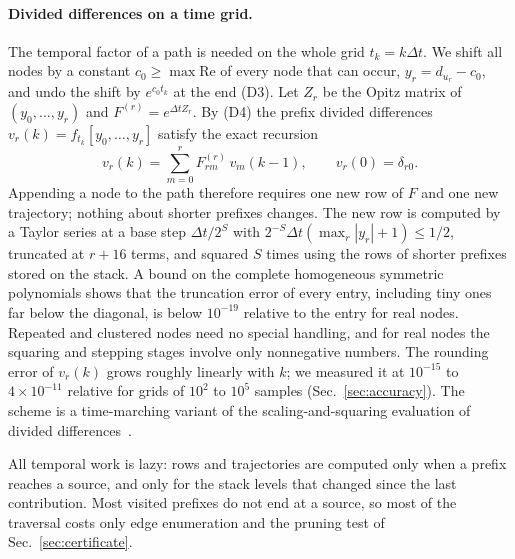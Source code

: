 \documentclass[aps,pra,superscriptaddress,floatfix,longbibliography,twocolumn]{revtex4-2}
\begin{document}
\paragraph*{Divided differences on a time grid.} The temporal factor of a path is needed on the whole grid $t_k=k\Delta t$. We shift all nodes by a constant $c_0\ge\max\mathrm{Re}$ of every node that can occur, $y_r=d_{u_r}-c_0$, and undo the shift by $e^{c_0t_k}$ at the end (D3). Let $Z_r$ be the Opitz matrix of $(y_0,\dots,y_r)$ and $F^{(r)}=e^{\Delta t Z_r}$. By (D4) the prefix divided differences $v_r(k)=f_{t_k}[y_0,\dots,y_r]$ satisfy the exact recursion
\begin{equation}\label{eq:traj}
v_r(k)=\sum_{m=0}^{r}F^{(r)}_{rm}\,v_m(k-1),\qquad v_r(0)=\delta_{r0}.
\end{equation}
Appending a node to the path therefore requires one new row of $F$ and one new trajectory; nothing about shorter prefixes changes. The new row is computed by a Taylor series at a base step $\Delta t/2^S$ with $2^{-S}\Delta t(\max_r|y_r|+1)\le1/2$, truncated at $r+16$ terms, and squared $S$ times using the rows of shorter prefixes stored on the stack. A bound on the complete homogeneous symmetric polynomials shows that the truncation error of every entry, including tiny ones far below the diagonal, is below $10^{-19}$ relative to the entry for real nodes. Repeated and clustered nodes need no special handling, and for real nodes the squaring and stepping stages involve only nonnegative numbers. The rounding error of $v_r(k)$ grows roughly linearly with $k$; we measured it at $10^{-15}$ to $4\times10^{-11}$ relative for grids of $10^2$ to $10^5$ samples (Sec.~\ref{sec:accuracy}). The scheme is a time-marching variant of the scaling-and-squaring evaluation of divided differences~\cite{mccurdy1984,caliari2007,zivcovich2019}.

All temporal work is lazy: rows and trajectories are computed only when a prefix reaches a source, and only for the stack levels that changed since the last contribution. Most visited prefixes do not end at a source, so most of the traversal costs only edge enumeration and the pruning test of Sec.~\ref{sec:certificate}.
\end{document}
